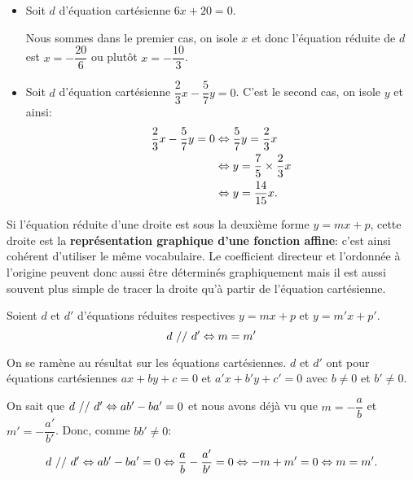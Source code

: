\documentclass[cours,couleur]{mathsRC}
\begin{document}
\begin{exemples}
\begin{itemize}[leftmargin=*]
\item
Soit $d$ d'équation cartésienne $6x+20=0$.

Nous sommes dans le premier cas, on isole $x$ et donc l'équation réduite de $d$ est $x=-\dfrac{20}{6}$ ou plutôt $x=-\dfrac{10}{3}$.
\item
Soit $d$ d'équation cartésienne $\dfrac{2}{3}x-\dfrac{5}{7}y=0$. C'est le second cas, on isole $y$ et ainsi:
\begin{align*}
\dfrac{2}{3}x-\dfrac{5}{7}y=0 &\Leftrightarrow \dfrac{5}{7}y=\dfrac{2}{3}x\\
&\Leftrightarrow y=\dfrac{7}{5}\times \dfrac{2}{3}x\\
&\Leftrightarrow y=\dfrac{14}{15}x.
\end{align*}
\end{itemize}
\end{exemples}

\begin{remarque}
Si l'équation réduite d'une droite est sous la deuxième forme $y=mx+p$, cette droite est la \textbf{représentation graphique d'une fonction affine}: c'est ainsi cohérent d'utiliser le même vocabulaire. Le coefficient directeur et l'ordonnée à l'origine peuvent donc aussi être déterminés graphiquement mais il est aussi souvent plus simple de tracer la droite qu'à partir de l'équation cartésienne.
\end{remarque}

\begin{theoreme}
Soient $d$ et $d'$ d'équations réduites respectives $y=mx+p$ et $y=m'x+p'$.
\[
d\ //\ d' \Leftrightarrow m=m'
\]
\end{theoreme}

\begin{demonstration}
On se ramène au résultat sur les équations cartésiennes. $d$ et $d'$ ont pour équations cartésiennes $ax+by+c=0$ et $a'x+b'y+c'=0$ avec $b\neq 0$ et $b'\neq 0$. 

\bigskip
On sait que $d\ //\ d' \Leftrightarrow ab'-ba'=0$ et nous avons déjà vu que $m=-\dfrac{a}{b}$ et $m'=-\dfrac{a'}{b'}$. Donc, comme $bb'\neq 0$:
\[
d\ //\ d' \Leftrightarrow ab'-ba'=0 \Leftrightarrow \dfrac{a}{b}-\dfrac{a'}{b'}=0 \Leftrightarrow -m+m'=0 \Leftrightarrow m=m'.
\]
\end{demonstration}
\end{document}
